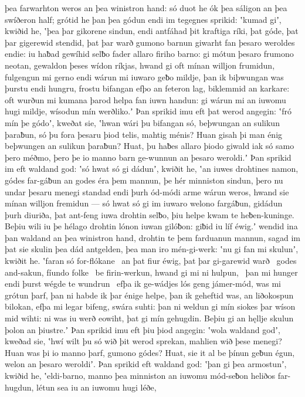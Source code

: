 þea farwarhton weros an þea winistron hand:
só duot he ók þea sáligon an þea swíðeron half;
grótid he þan þea gódun endi im tegegnes sprikid:
ʽkumad giʼ, kwiðid he, ʽþea þar gikorene sindun, endi antfáhad þit kraftiga ríki,
þat góde, þat þar gigerewid stendid, þat þar warð gumono barnun
giwarht fan þesaro weroldes endie: iu haƀad gewíhid selƀo
fader allaro firiho barno: gi mótun þesaro frumono neotan,
gewaldon þeses wídon ríkjas, hwand gi oft mínan willjon frumidun,
fulgengun mi gerno endi wárun mi iuwaro geƀo mildje,
þan ik biþwungan was þurstu endi hungru,
frostu bifangan efþo an feteron lag,
biklemmid an karkare: oft wurðun mi kumana þarod
helpa fan iuwn handun: gi wárun mi an iuwomu hugi mildje,
wísodun mín werðliko.ʼ Þan sprikid imu eft þat werod angegin:
ʽfró mín þe gódoʼ, kweðat sie, ʽhwan wári þu bifangan só,
beþwungan an sulikun þaraƀun, só þu fora þesaru þiod telis,
mahtig ménis? Huan gisah þi man énig
beþwungen an sulikun þaraƀun? Huat, þu haƀes allaro þiodo giwald
iak só samo þero méðmo, þero þe io manno barn
ge-wunnun an þesaro weroldi.ʼ Þan sprikid im eft waldand god:
ʽsó hwat só gi dádunʼ, kwiðit he, ʽan iuwes drohtines namon,
gódes far-gáƀun an godes éra
þem mannun, þe hér minniston sindun, þero nu undar þesaru menegi standad
endi þurh ód-módi arme wárun
weros, hwand sie mínan willjon fremidun — só hwat só gi im iuwaro welono fargáƀun,
gidádun þurh diuriða, þat ant-feng iuwa drohtin selƀo,
þiu helpe kwam te heƀen-kuninge. Beþiu wili iu þe hélago drohtin
lónon iuwan gilóƀon: giƀid iu líf éwig.ʼ
wendid ina þan waldand an þea winistron hand,
drohtin te þem farduanun mannun, sagad im þat sie skulin þea dád antgelden,
þea man iro mén-gi-werk: ʽnu gi fan mi skulunʼ, kwiðit he.
ʽfaran só for-flókane \hld\ an þat fiur éwig,
þat þar gi-garewid warð \hld\ godes and-sakun,
fíundo folke \hld\ be firin-werkun,
hwand gi mi ni hulpun, \hld\ þan mi hunger endi þurst
wégde te wundrun \hld\ efþa ik ge-wádjes lós
geng jámer-mód, was mi grótun þarf,
þan ni habde ik þar énige helpe, þan ik geheftid was,
an liðokospun bilokan, efþa mi legar bifeng,
swára suhti: þan ni weldun gi mín siokes þar
wíson mid wihti: ni was iu werð eowiht,
þat gi mín gehugdin. Beþiu gi an hęllje skulun
þolon an þiustre.ʼ Þan sprikid imu eft þiu þiod angegin:
ʽwola waldand godʼ, kweðad sie, ʽhwí wilt þu só wið þit werod sprekan,
mahlien wið þese menegi? Huan was þi io manno þarf,
gumono gódes? Huat, sie it al be þínun geƀun égun,
welon an þesaro weroldiʼ. Þan sprikid eft waldand god:
ʽþan gi þea armostunʼ, kwiðid he, ʽeldi-barno,
manno þea minniston an iuwomu mód-seƀon
heliðos far-hugdun, létun sea iu an iuwomu hugi léðe,
